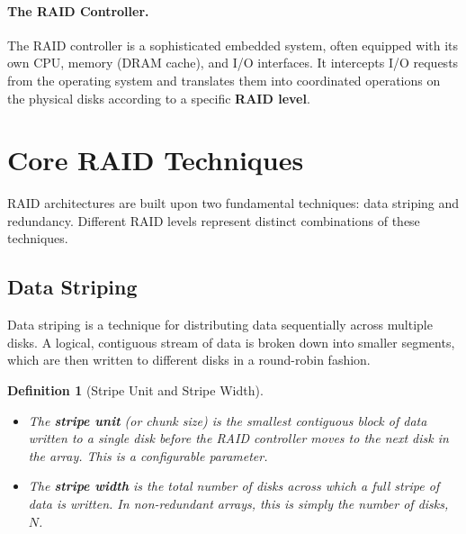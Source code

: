 \documentclass[12pt]{article}
\newtheorem{definition}{Definition}[section]
\begin{document}
\paragraph{The RAID Controller.} The RAID controller is a sophisticated embedded system, often equipped with its own CPU, memory (DRAM cache), and I/O interfaces. It intercepts I/O requests from the operating system and translates them into coordinated operations on the physical disks according to a specific \textbf{RAID level}.

\newpage
\section{Core RAID Techniques}

RAID architectures are built upon two fundamental techniques: data striping and redundancy. Different RAID levels represent distinct combinations of these techniques.

\subsection{Data Striping}

Data striping is a technique for distributing data sequentially across multiple disks. A logical, contiguous stream of data is broken down into smaller segments, which are then written to different disks in a round-robin fashion.

\begin{definition}[Stripe Unit and Stripe Width]
    \begin{itemize}
        \item The \textbf{stripe unit} (or chunk size) is the smallest contiguous block of data written to a single disk before the RAID controller moves to the next disk in the array. This is a configurable parameter.
        \item The \textbf{stripe width} is the total number of disks across which a full stripe of data is written. In non-redundant arrays, this is simply the number of disks, $N$.
    \end{itemize}
\end{definition}
\end{document}
